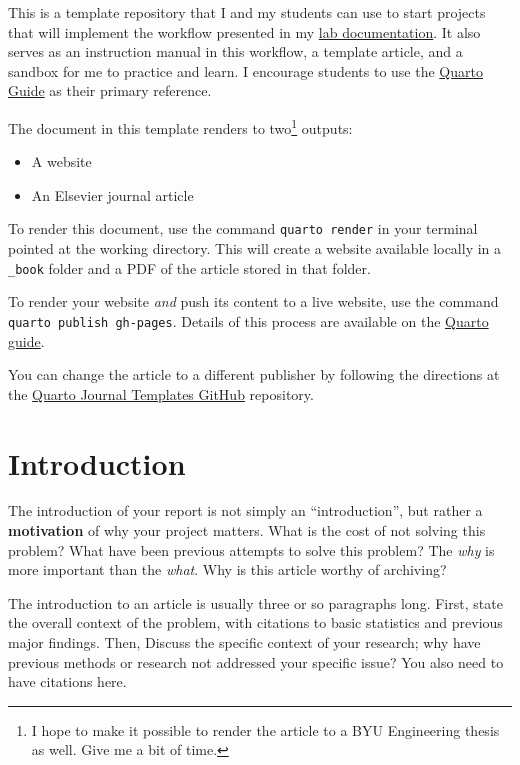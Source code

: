 \documentclass[
  letterpaper,
  authoryear]{elsarticle}
\begin{document}
This is a template repository that I and my students can use to start
projects that will implement the workflow presented in my
\href{https://gregmacfarlane.github.io/lab/workflow.html}{lab
documentation}. It also serves as an instruction manual in this
workflow, a template article, and a sandbox for me to practice and
learn. I encourage students to use the
\href{https://quarto.org/docs/guide/}{Quarto Guide} as their primary
reference.

The document in this template renders to two\footnote{I hope to make it
  possible to render the article to a BYU Engineering thesis as well.
  Give me a bit of time.} outputs:

\begin{itemize}
\item
  A website
\item
  An Elsevier journal article
\end{itemize}

To render this document, use the command \texttt{quarto\ render} in your
terminal pointed at the working directory. This will create a website
available locally in a \texttt{\_book} folder and a PDF of the article
stored in that folder.

To render your website \emph{and} push its content to a live website,
use the command \texttt{quarto\ publish\ gh-pages}. Details of this
process are available on the
\href{https://quarto.org/docs/publishing/github-pages.html\#publish-command}{Quarto
guide}.

You can change the article to a different publisher by following the
directions at the \href{https://github.com/quarto-journals}{Quarto
Journal Templates GitHub} repository.


\hypertarget{introduction}{%
\section{Introduction}\label{introduction}}

The introduction of your report is not simply an ``introduction'', but
rather a \textbf{motivation} of why your project matters. What is the
cost of not solving this problem? What have been previous attempts to
solve this problem? The \emph{why} is more important than the
\emph{what}. Why is this article worthy of archiving?

The introduction to an article is usually three or so paragraphs long.
First, state the overall context of the problem, with citations to basic
statistics and previous major findings. Then, Discuss the specific
context of your research; why have previous methods or research not
addressed your specific issue? You also need to have citations here.
\end{document}
